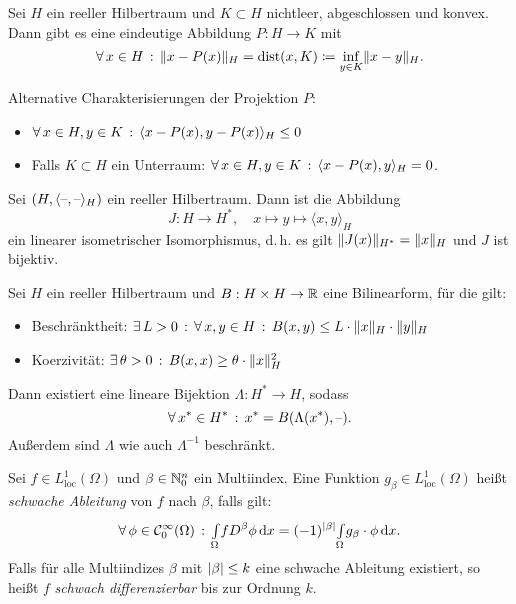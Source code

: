 \documentclass{cheat-sheet}
\newcommand{\dist}{\mathrm{dist}} %
\newcommand{\scp}[2]{\langle #1 , #2 \rangle} %
\begin{document}
\begin{satz}[Projektionssatz]
  Sei $H$ ein reeller Hilbertraum und $K \subset H$ nichtleer, abgeschlossen und konvex. Dann gibt es eine eindeutige Abbildung $P : H \to K$ mit
  \[ \fa{x \in H} \norm{x - P(x)}_H = \dist(x, K) \coloneqq \inf_{y \in K} \norm{x - y}_H. \]
\end{satz}

\begin{bem}
  Alternative Charakterisierungen der Projektion $P$:
  \begin{itemize}
    \item $\fa{x \in H, y \in K} \scp{x - P(x)}{y - P(x)}_H \leq 0$
    \item Falls $K \subset H$ ein Unterraum: $\fa{x \in H, y \in K} \scp{x - P(x)}{y}_H = 0$.
  \end{itemize}
\end{bem}

\begin{satz}
  Sei $(H, \scp{\blank}{\blank}_H)$ ein reeller Hilbertraum. Dann ist die Abbildung
  \[
    J : H \to H^*, \quad
    x \mapsto y \mapsto \scp{x}{y}_H
  \]
  ein linearer isometrischer Isomorphismus, d.\,h. es gilt $\lVert J(x)\rVert_{H^*} = \lVert x\rVert_H$ und $J$ ist bijektiv.
\end{satz}

\begin{satz}
  Sei $H$ ein reeller Hilbertraum und $B : H \times H \to \mathbb{R}$ eine Bilinearform, für die gilt:
  \begin{itemize}
    \item Beschränktheit: $\exists \, {L > 0} \,:\, \forall \, {x, y \in H} \,:\, B(x, y) \leq L \cdot \lVert x\rVert_H \cdot \lVert y\rVert_H$
    \item Koerzivität: $\exists \, {\theta > 0} \,:\, B(x, x) \geq \theta \cdot \lVert x\rVert_H^2$
  \end{itemize}
  Dann existiert eine lineare Bijektion $\Lambda : H^* \to H$, sodass
  \[ \forall \, {x^* \in H^*} \,:\, x^* = B(\Lambda(x^*), \text{--}). \]
  Außerdem sind $\Lambda$ wie auch $\Lambda^{-1}$ beschränkt.
\end{satz}


\begin{defn}
  Sei $f \in L^1_{\text{loc}}(\Omega)$ und $\beta \in \mathbb{N}_0^n$ ein Multiindex. Eine Funktion $g_\beta \in L^1_{\text{loc}}(\Omega)$ heißt \emph{schwache Ableitung} von $f$ nach $\beta$, falls gilt:
  \[
    \forall \, {\phi \in \mathcal{C}_0^\infty(\Omega)} \,:\,
    {\textstyle \int\limits_{\Omega}^{}} f D^\beta \phi \,\mathrm{d} x = (-1)^{\lvert\beta\rvert} {\textstyle \int\limits_{\Omega}^{}} g_\beta \cdot \phi \,\mathrm{d} x.
  \]
  Falls für alle Multiindizes $\beta$ mit $\lvert\beta\rvert \leq k$ eine schwache Ableitung existiert, so heißt $f$ \emph{schwach differenzierbar} bis zur Ordnung $k$.
\end{defn}
\end{document}

